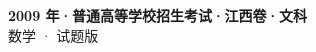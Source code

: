 \documentclass[zihao=-4, a4paper]{ctexart}
\begin{document}
\begin{center}
  {\Large\bfseries 2009 年·普通高等学校招生考试·江西卷·文科}\\[4pt]
  {\large 数学 · 试题版}
\end{center}
\medskip
{}

\end{document}
